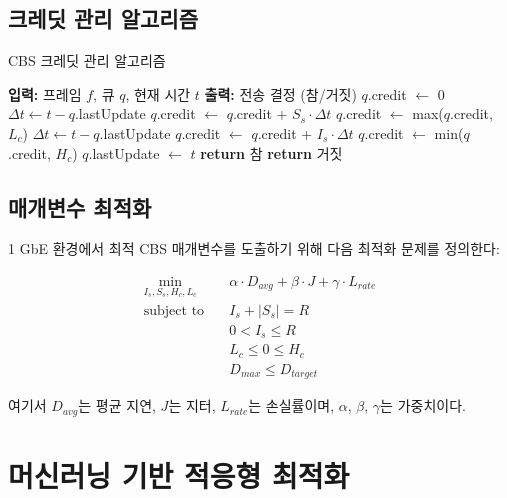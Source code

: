 \documentclass[12pt, a4paper]{article}
\begin{document}
\subsection{크레딧 관리 알고리즘}

\begin{algorithm}
\caption{CBS 크레딧 관리 알고리즘}
\label{alg:cbs_credit}
\begin{algorithmic}[1]
\STATE \textbf{입력:} 프레임 $f$, 큐 $q$, 현재 시간 $t$
\STATE \textbf{출력:} 전송 결정 (참/거짓)
\STATE
{}
    \STATE $q$.credit $\leftarrow$ 0
\ELSE
        \STATE $\Delta t \leftarrow t - q$.lastUpdate
        \STATE $q$.credit $\leftarrow$ $q$.credit + $S_s \cdot \Delta t$
        \STATE $q$.credit $\leftarrow$ max($q$.credit, $L_c$)
    \ELSE
        \STATE $\Delta t \leftarrow t - q$.lastUpdate
        \STATE $q$.credit $\leftarrow$ $q$.credit + $I_s \cdot \Delta t$
        \STATE $q$.credit $\leftarrow$ min($q$.credit, $H_c$)
    \ENDIF
\ENDIF
\STATE $q$.lastUpdate $\leftarrow$ $t$
\STATE
{}
    \STATE \textbf{return} 참
\ELSE
    \STATE \textbf{return} 거짓
\ENDIF
\end{algorithmic}
\end{algorithm}

\subsection{매개변수 최적화}

1 GbE 환경에서 최적 CBS 매개변수를 도출하기 위해 다음 최적화 문제를 정의한다:

\begin{equation}
\begin{aligned}
\min_{I_s, S_s, H_c, L_c} \quad & \alpha \cdot D_{avg} + \beta \cdot J + \gamma \cdot L_{rate} \\
\text{subject to} \quad & I_s + |S_s| = R \\
& 0 < I_s \leq R \\
& L_c \leq 0 \leq H_c \\
& D_{max} \leq D_{target}
\end{aligned}
\end{equation}

여기서 $D_{avg}$는 평균 지연, $J$는 지터, $L_{rate}$는 손실률이며, $\alpha$, $\beta$, $\gamma$는 가중치이다.

\section{머신러닝 기반 적응형 최적화}
\end{document}

